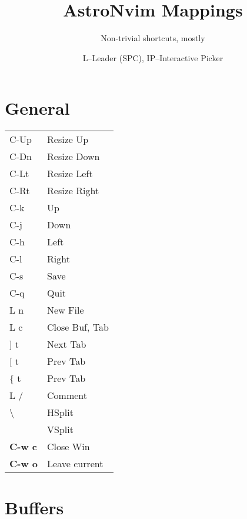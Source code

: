 \documentclass[
  ,landscape
  ,columns=4
]{cheatsheet}
\title{AstroNvim Mappings}
\author{Non-trivial shortcuts, mostly}
\date{L--Leader (SPC), IP--Interactive Picker}
\begin{document}
\maketitle

\section{General}

\begin{tabular}{l>{\color{black}}l}
	C-Up           & Resize Up      \\
	C-Dn           & Resize Down    \\
	C-Lt           & Resize Left    \\
	C-Rt           & Resize Right   \\
	C-k            & Up             \\
	C-j            & Down           \\
	C-h            & Left           \\
	C-l            & Right          \\
	C-s            & Save           \\
	C-q            & Quit           \\
	L n            & New File       \\
	L c            & Close Buf, Tab \\
	{]} t          & Next Tab       \\
	{[} t          & Prev Tab       \\
	\{ t           & Prev Tab       \\
	L /            & Comment        \\
	\textbackslash & HSplit         \\
	\textbar       & VSplit         \\
	\textbf{C-w c} & Close Win      \\
	\textbf{C-w o} & Leave current  \\
\end{tabular}

\section{Buffers}
\end{document}
